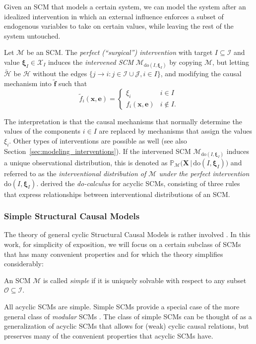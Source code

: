 \documentclass[twoside,11pt]{article}
\newcommand{\Prb}{\mathbb{P}}
\newcommand\B[1]{\bm{#1}}
\newcommand\C[1]{\mathcal{#1}}
\newcommand\BC[1]{\bm{\mathcal{#1}}}
\newcommand\given{\,|\,}
\newcommand{\intervene}{\mathrm{do}}
\begin{document}
Given an SCM that models a certain system, we can model the system after an idealized intervention in which an external
influence enforces a subset of endogenous variables to take on certain values, while leaving the rest of the system untouched.
\begin{definition}
Let $\C{M}$ be an SCM. The \emph{perfect (``surgical'') intervention} with target $I \subseteq \C{I}$
and value $\B{\xi}_I \in \BC{X}_I$ induces the \emph{intervened SCM} $\C{M}_{\intervene(I,\B{\xi}_I)}$ by copying $\C{M}$,
but letting $\tilde{\C{H}}$ be $\C{H}$ without the edges $\{j \to i : j \in \C{I} \cup \C{J}, i \in I\}$, and
modifying the causal mechanism into $\tilde{\B{f}}$ such that
\begin{equation*}
  \tilde{f}_i(\B{x},\B{e}) = \begin{cases}
    \xi_i & i \in I \\
    f_i(\B{x},\B{e}) & i \notin I.
  \end{cases}
\end{equation*}
\end{definition}
The interpretation is that the causal mechanisms that normally determine the values of the components $i \in I$ are 
replaced by mechanisms that assign the values $\xi_i$. Other types of interventions are possible as well 
(see also Section~\ref{sec:modeling_interventions}). If the intervened SCM $\C{M}_{\intervene(I,\B{\xi}_I)}$ induces a 
unique observational distribution, this is denoted as $\Prb_{\C{M}}\big(\B{X} \given \intervene(I,\B{\xi}_I)\big)$ and
referred to as the \emph{interventional distribution of $\C{M}$ under the perfect intervention $\intervene(I,\B{\xi}_I)$}.
\citet{Pearl2009} derived the \emph{do-calculus} for acyclic SCMs, consisting of three rules that express relationships between 
interventional distributions of an SCM. 

\subsubsection{Simple Structural Causal Models}\label{sec:simple_scm}

The theory of general cyclic Structural Causal Models is rather involved \citep{Bongers++_1611.06221v2}.
In this work, for simplicity of exposition, we will focus on a certain subclass of SCMs that has many convenient properties
and for which the theory simplifies considerably:
\begin{definition}\label{def:simple_scm}
An SCM $\C{M}$ is called \emph{simple} if it is uniquely solvable with respect to any subset $\C{O} \subseteq \C{I}$.
\end{definition}
All acyclic SCMs are simple. 
Simple SCMs provide a special case of the more general class of \emph{modular} SCMs \citep{ForreMooij_1710.08775}.
The class of simple SCMs can be thought of as a generalization of acyclic SCMs that allows for (weak) cyclic causal relations, but preserves many of the convenient properties that acyclic SCMs have.
\end{document}
